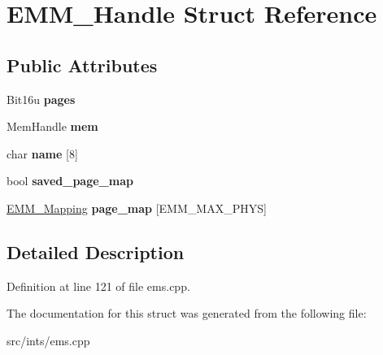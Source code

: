 \hypertarget{structEMM__Handle}{\section{E\-M\-M\-\_\-\-Handle Struct Reference}
\label{structEMM__Handle}
}
\subsection*{Public Attributes}
\begin{DoxyCompactItemize}
\item 
\hypertarget{structEMM__Handle_a8f6b6fdbb368b46a9092bf67ec268242}{Bit16u {\bfseries pages}}\label{structEMM__Handle_a8f6b6fdbb368b46a9092bf67ec268242}

\item 
\hypertarget{structEMM__Handle_ae2407285855af18647948ec831899e7b}{Mem\-Handle {\bfseries mem}}\label{structEMM__Handle_ae2407285855af18647948ec831899e7b}

\item 
\hypertarget{structEMM__Handle_a6fccb18b941ef48ded9a711b1c024103}{char {\bfseries name} \mbox{[}8\mbox{]}}\label{structEMM__Handle_a6fccb18b941ef48ded9a711b1c024103}

\item 
\hypertarget{structEMM__Handle_ae97a30d809922b3849311dc9ffe4d660}{bool {\bfseries saved\-\_\-page\-\_\-map}}\label{structEMM__Handle_ae97a30d809922b3849311dc9ffe4d660}

\item 
\hypertarget{structEMM__Handle_a1c900f12c39791084d9890233b8f10f3}{\hyperlink{structEMM__Mapping}{E\-M\-M\-\_\-\-Mapping} {\bfseries page\-\_\-map} \mbox{[}E\-M\-M\-\_\-\-M\-A\-X\-\_\-\-P\-H\-Y\-S\mbox{]}}\label{structEMM__Handle_a1c900f12c39791084d9890233b8f10f3}

\end{DoxyCompactItemize}


\subsection{Detailed Description}


Definition at line 121 of file ems.\-cpp.



The documentation for this struct was generated from the following file\-:\begin{DoxyCompactItemize}
\item 
src/ints/ems.\-cpp\end{DoxyCompactItemize}

